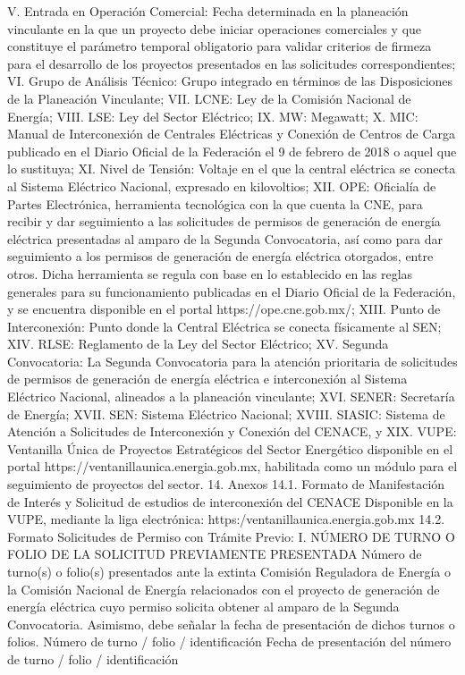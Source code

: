 V. Entrada en Operación Comercial: Fecha determinada en la planeación vinculante en la que un proyecto debe iniciar operaciones comerciales y que constituye el parámetro temporal obligatorio para validar criterios de firmeza para el desarrollo de los proyectos presentados en las solicitudes correspondientes;
VI. Grupo de Análisis Técnico: Grupo integrado en términos de las Disposiciones de la Planeación Vinculante;
VII. LCNE: Ley de la Comisión Nacional de Energía;
VIII. LSE: Ley del Sector Eléctrico;
IX. MW: Megawatt;
X. MIC: Manual de Interconexión de Centrales Eléctricas y Conexión de Centros de Carga publicado en el Diario Oficial de la Federación el 9 de febrero de 2018 o aquel que lo sustituya;
XI. Nivel de Tensión: Voltaje en el que la central eléctrica se conecta al Sistema Eléctrico Nacional, expresado en kilovoltios;
XII. OPE: Oficialía de Partes Electrónica, herramienta tecnológica con la que cuenta la CNE, para recibir y dar seguimiento a las solicitudes de permisos de generación de energía eléctrica presentadas al amparo de la Segunda Convocatoria, así como para dar seguimiento a los permisos de generación de energía eléctrica otorgados, entre otros. Dicha herramienta se regula con base en lo establecido en las reglas generales para su funcionamiento publicadas en el Diario Oficial de la Federación, y se encuentra disponible en el portal https://ope.cne.gob.mx/;
XIII. Punto de Interconexión: Punto donde la Central Eléctrica se conecta físicamente al SEN;
XIV. RLSE: Reglamento de la Ley del Sector Eléctrico;
XV. Segunda Convocatoria: La Segunda Convocatoria para la atención prioritaria de solicitudes de permisos de generación de energía eléctrica e interconexión al Sistema Eléctrico Nacional, alineados a la planeación vinculante;
XVI. SENER: Secretaría de Energía;
XVII. SEN: Sistema Eléctrico Nacional;
XVIII. SIASIC: Sistema de Atención a Solicitudes de Interconexión y Conexión del CENACE, y
XIX. VUPE: Ventanilla Única de Proyectos Estratégicos del Sector Energético disponible en el portal https://ventanillaunica.energia.gob.mx, habilitada como un módulo para el seguimiento de proyectos del sector.
14. Anexos
14.1. Formato de Manifestación de Interés y Solicitud de estudios de interconexión del CENACE
Disponible en la VUPE, mediante la liga electrónica: https:/ventanillaunica.energia.gob.mx
14.2. Formato Solicitudes de Permiso con Trámite Previo:
I. NÚMERO DE TURNO O FOLIO DE LA SOLICITUD PREVIAMENTE PRESENTADA
Número de turno(s) o folio(s) presentados ante la extinta Comisión Reguladora de Energía o la Comisión Nacional de Energía relacionados con el proyecto de generación de energía eléctrica cuyo permiso solicita obtener al amparo de la Segunda Convocatoria. Asimismo, debe señalar la fecha de presentación de dichos turnos o folios.
 Número de turno / folio / identificación
 Fecha de presentación del número de turno / folio / identificación
 
